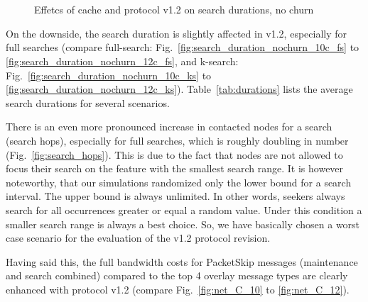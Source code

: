 \begin{figure}[htbp]
{  }
  \\[-1ex]
  \\[-1ex]

  \caption{Effetcs of cache and protocol v1.2 on search durations, no churn}
  \label{fig:search_durations_nochurn}
\end{figure}

On the downside, the search duration is slightly affected in v1.2, especially for full searches (compare full-search: Fig.~\ref{fig:search_duration_nochurn_10c_fs} to \ref{fig:search_duration_nochurn_12c_fs}, and k-search: Fig.~\ref{fig:search_duration_nochurn_10c_ks} to \ref{fig:search_duration_nochurn_12c_ks}).
Table~\ref{tab:durations} lists the average search durations for several scenarios.

There is an even more pronounced increase in contacted nodes for a search (search hops), especially for full searches, which is roughly doubling in number (Fig.~\ref{fig:search_hops}).
This is due to the fact that nodes are not allowed to focus their search on the feature with the smallest search range. It is however noteworthy, that our simulations randomized only the lower bound for a search interval. The upper bound is always unlimited. In other words, seekers always search for all occurrences greater or equal a random value. Under this condition a smaller search range is always a best choice. So, we have basically chosen a worst case scenario for the evaluation of the v1.2 protocol revision.

Having said this, the full bandwidth costs for PacketSkip messages (maintenance and search combined) compared to the top 4 overlay message types are clearly enhanced with protocol v1.2 (compare Fig.~\ref{fig:net_C_10} to \ref{fig:net_C_12}).

